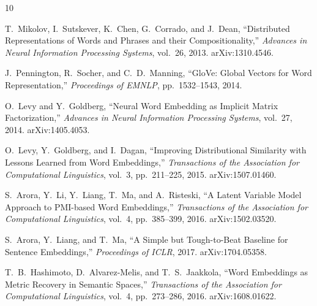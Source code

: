 \documentclass[11pt]{article}
\begin{document}
\begin{thebibliography}{10}

T.~Mikolov, I.~Sutskever, K.~Chen, G.~Corrado, and J.~Dean,
``Distributed Representations of Words and Phrases and their Compositionality,''
\emph{Advances in Neural Information Processing Systems}, vol.~26, 2013.
arXiv:1310.4546.

J.~Pennington, R.~Socher, and C.~D.~Manning,
``GloVe: Global Vectors for Word Representation,''
\emph{Proceedings of EMNLP}, pp.~1532--1543, 2014.

O.~Levy and Y.~Goldberg,
``Neural Word Embedding as Implicit Matrix Factorization,''
\emph{Advances in Neural Information Processing Systems}, vol.~27, 2014.
arXiv:1405.4053.

O.~Levy, Y.~Goldberg, and I.~Dagan,
``Improving Distributional Similarity with Lessons Learned from Word Embeddings,''
\emph{Transactions of the Association for Computational Linguistics}, vol.~3, pp.~211--225, 2015.
arXiv:1507.01460.

S.~Arora, Y.~Li, Y.~Liang, T.~Ma, and A.~Risteski,
``A Latent Variable Model Approach to PMI-based Word Embeddings,''
\emph{Transactions of the Association for Computational Linguistics}, vol.~4, pp.~385--399, 2016.
arXiv:1502.03520.

S.~Arora, Y.~Liang, and T.~Ma,
``A Simple but Tough-to-Beat Baseline for Sentence Embeddings,''
\emph{Proceedings of ICLR}, 2017.
arXiv:1704.05358.

T.~B.~Hashimoto, D.~Alvarez-Melis, and T.~S.~Jaakkola,
``Word Embeddings as Metric Recovery in Semantic Spaces,''
\emph{Transactions of the Association for Computational Linguistics}, vol.~4, pp.~273--286, 2016.
arXiv:1608.01622.

\end{thebibliography}
\end{document}
